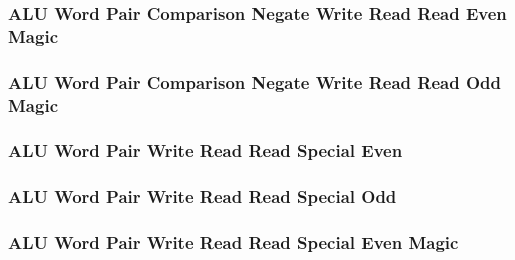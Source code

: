 \subsubsection[{\small ALU Word Pair Comparison Negate Write Read Read Even Magic}]{ALU Word Pair Comparison Negate Write Read Read Even Magic} \label{sec:format-ALU-WPCNWRRE.M}



\subsubsection[{\small ALU Word Pair Comparison Negate Write Read Read Odd Magic}]{ALU Word Pair Comparison Negate Write Read Read Odd Magic} \label{sec:format-ALU-WPCNWRRO.M}



\subsubsection[{\small ALU Word Pair Write Read Read Special Even}]{ALU Word Pair Write Read Read Special Even} \label{sec:format-ALU-WPWRRSE}



\subsubsection[{\small ALU Word Pair Write Read Read Special Odd}]{ALU Word Pair Write Read Read Special Odd} \label{sec:format-ALU-WPWRRSO}



\subsubsection[{\small ALU Word Pair Write Read Read Special Even Magic}]{ALU Word Pair Write Read Read Special Even Magic} \label{sec:format-ALU-WPWRRSE.M}



